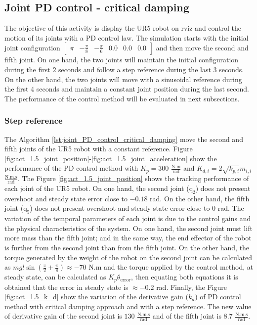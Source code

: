 \subsection{Joint PD control - critical damping}
The objective of this activity is display the UR5 robot on rviz and control the motion of its joints with a PD control law. The simulation starts with the initial joint configuration $\begin{bmatrix} \pi & -\frac{\pi}{8} & -\frac{\pi}{6} & 0.0 & 0.0 & 0.0 \end{bmatrix}$ and then move the second and fifth joint. On one hand, the two joints will maintain the initial configuration during the first $2$ seconds and follow a step reference during the last $3$ seconds. On the other hand, the two joints  will move with a sinusoidal reference during the first $4$ seconds and  maintain a constant joint position during the last second. The performance of the control method will be evaluated in next subsections.

\subsubsection{Step reference}
The Algorithm \ref{lst:joint_PD_control_critical_damping} move the second and fifth joints of the UR5 robot with a constant reference. Figure \ref{fig:act_1.5_joint_position}-\ref{fig:act_1.5_joint_acceleration} show the performance of the PD control method with $K_p=300$ $\mathrm{\frac{N.m}{rad}}$ and $K_{d,i}= 2 \sqrt{k_{p,i}} m_{i,i}$ $\mathrm{\frac{N.m.s}{rad}}$. The Figure \ref{fig:act_1.5_joint_position} shows the tracking performance of each joint of the UR5 robot. On one hand, the second joint ($\mathrm{q}_2$) does not present overshoot and steady state error close to $-0.18$ rad. On the other hand, the fifth joint ($\mathrm{q}_5$) does not present overshoot and steady state error close to $0$ rad. The variation of the temporal parameters of each joint is due to the control gains and the physical characteristics of the system. On one hand, the second joint must lift more mass than the fifth joint; and in the same way, the end effector of the robot is further from the second joint than from the fifth joint. On the other hand, the torque generated by the weight of the robot on the second joint can be calculated as $m g l \sin({\frac{\pi}{2} + \frac{\pi}{8}}) \approx -70$ N.m and the torque applied by the control method, at steady state, can be calculated as $K_p \theta_{\mathrm{error}}$, then equating both equations it is obtained that the error in steady state is $\approx -0.2$ rad. Finally, the Figure \ref{fig:act_1.5_k_d} show the variation of the derivative gain ($k_d$) of PD control method with critical damping approach and with a step reference. The new value of derivative gain of the second joint is $130$ $\mathrm{\frac{N.m.s}{rad}}$ and of the fifth joint is $8.7$ $\mathrm{\frac{N.m.s}{rad}}$. 

